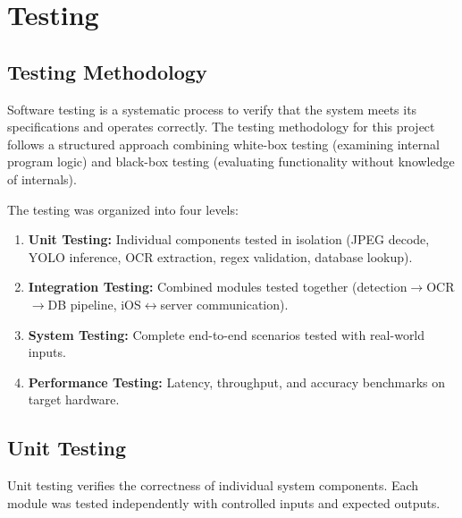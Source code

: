 \documentclass[11pt]{report}
\begin{document}
\chapter{Testing}

\section{Testing Methodology}
Software testing is a systematic process to verify that the system meets its specifications and operates correctly. The testing methodology for this project follows a structured approach combining white-box testing (examining internal program logic) and black-box testing (evaluating functionality without knowledge of internals).

The testing was organized into four levels:
\begin{enumerate}
    \item \textbf{Unit Testing:} Individual components tested in isolation (JPEG decode, YOLO inference, OCR extraction, regex validation, database lookup).
    \item \textbf{Integration Testing:} Combined modules tested together (detection$\to$OCR$\to$DB pipeline, iOS$\leftrightarrow$server communication).
    \item \textbf{System Testing:} Complete end-to-end scenarios tested with real-world inputs.
    \item \textbf{Performance Testing:} Latency, throughput, and accuracy benchmarks on target hardware.
\end{enumerate}

\section{Unit Testing}
Unit testing verifies the correctness of individual system components. Each module was tested independently with controlled inputs and expected outputs.
\end{document}
